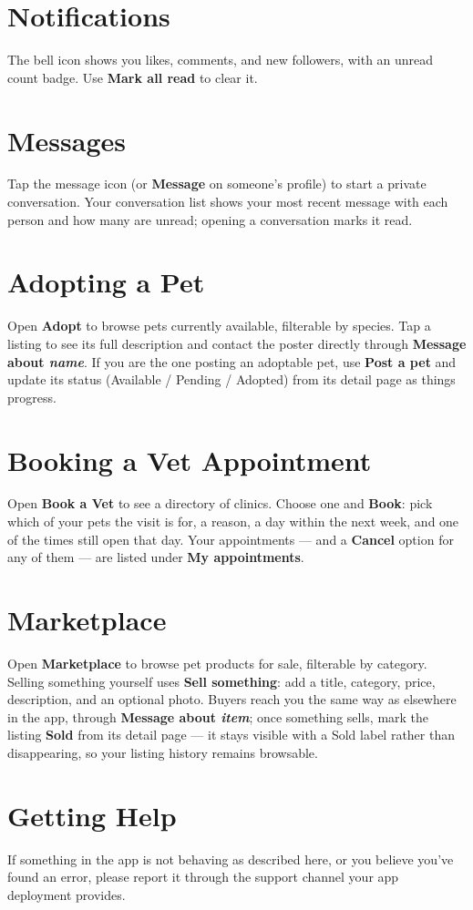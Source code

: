 \documentclass[11pt,a4paper]{article}
\begin{document}
\section{Notifications}
The bell icon shows you likes, comments, and new followers, with an unread count badge.
Use \textbf{Mark all read} to clear it.

\section{Messages}
Tap the message icon (or \textbf{Message} on someone's profile) to start a private
conversation. Your conversation list shows your most recent message with each person
and how many are unread; opening a conversation marks it read.

\section{Adopting a Pet}
Open \textbf{Adopt} to browse pets currently available, filterable by species. Tap a
listing to see its full description and contact the poster directly through
\textbf{Message about \emph{name}}. If you are the one posting an adoptable pet, use
\textbf{Post a pet} and update its status (Available / Pending / Adopted) from its
detail page as things progress.

\section{Booking a Vet Appointment}
Open \textbf{Book a Vet} to see a directory of clinics. Choose one and \textbf{Book}:
pick which of your pets the visit is for, a reason, a day within the next week, and one
of the times still open that day. Your appointments --- and a \textbf{Cancel} option
for any of them --- are listed under \textbf{My appointments}.

\section{Marketplace}
Open \textbf{Marketplace} to browse pet products for sale, filterable by category.
Selling something yourself uses \textbf{Sell something}: add a title, category, price,
description, and an optional photo. Buyers reach you the same way as elsewhere in the
app, through \textbf{Message about \emph{item}}; once something sells, mark the
listing \textbf{Sold} from its detail page --- it stays visible with a Sold label
rather than disappearing, so your listing history remains browsable.

\section{Getting Help}
If something in the app is not behaving as described here, or you believe you've found
an error, please report it through the support channel your app deployment provides.
\end{document}
